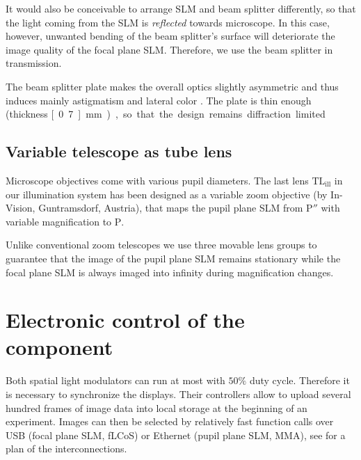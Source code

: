 It would also be conceivable to arrange SLM and beam splitter
differently, so that the light coming from the SLM is \emph{reflected}
towards microscope. In this case, however, unwanted bending of the
beam splitter's surface will deteriorate the image quality of the
focal plane SLM. Therefore, we use the beam splitter in transmission.


The beam splitter plate makes the overall optics slightly asymmetric
and thus induces mainly astigmatism and lateral color
\citep{Ipp2009a}. The plate is thin enough (thickness \unit[0.7]{mm}),
so that the design remains diffraction limited.

 	
	  	

\subsection{ Variable telescope as tube lens}
Microscope objectives come with various pupil diameters. The last lens
$\textrm{TL}_\textrm{ill}$ in our illumination system has been
designed as a variable zoom objective (by In-Vision, Guntramsdorf,
Austria), that maps the pupil plane SLM from $\textrm{P}''$ with
variable magnification to $\textrm{P}$.

Unlike conventional zoom telescopes we use three movable lens groups
to guarantee that the image of the pupil plane SLM remains stationary
while the focal plane SLM is always imaged into infinity during
magnification changes.



\section{Electronic control of the component}
Both spatial light modulators can run at most with $50\%$ duty
 cycle. Therefore it is necessary to
synchronize the displays. Their controllers allow to upload several
hundred frames of image data into local storage at the beginning of an
experiment. Images can then be selected by relatively fast function
calls over USB (focal plane SLM, fLCoS) or Ethernet (pupil plane SLM,
MMA), see  for a plan of the
interconnections.

